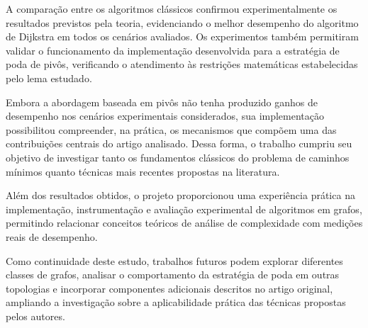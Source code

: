 \documentclass[10pt,a4paper]{article}
\begin{document}
A comparação entre os algoritmos clássicos confirmou experimentalmente os resultados previstos pela teoria, evidenciando o melhor desempenho do algoritmo de Dijkstra em todos os cenários avaliados. Os experimentos também permitiram validar o funcionamento da implementação desenvolvida para a estratégia de poda de pivôs, verificando o atendimento às restrições matemáticas estabelecidas pelo lema estudado.

Embora a abordagem baseada em pivôs não tenha produzido ganhos de desempenho nos cenários experimentais considerados, sua implementação possibilitou compreender, na prática, os mecanismos que compõem uma das contribuições centrais do artigo analisado. Dessa forma, o trabalho cumpriu seu objetivo de investigar tanto os fundamentos clássicos do problema de caminhos mínimos quanto técnicas mais recentes propostas na literatura.

Além dos resultados obtidos, o projeto proporcionou uma experiência prática na implementação, instrumentação e avaliação experimental de algoritmos em grafos, permitindo relacionar conceitos teóricos de análise de complexidade com medições reais de desempenho.

Como continuidade deste estudo, trabalhos futuros podem explorar diferentes classes de grafos, analisar o comportamento da estratégia de poda em outras topologias e incorporar componentes adicionais descritos no artigo original, ampliando a investigação sobre a aplicabilidade prática das técnicas propostas pelos autores.




\end{document}
